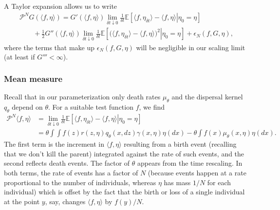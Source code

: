 \documentclass[12pt]{article}
\newcommand{\IE}{\mathbb E}
\newcommand{\Pgen}{\mathcal{P}}    %
\numberwithin{equation}{section}
\begin{document}
A Taylor expansion allows us to write
\begin{multline}
	\label{generator prelimit}
    \Pgen^N
    G(\langle f,\eta \rangle)
    =
    G'(\langle f, \eta \rangle)
    \lim_{\delta t\downarrow 0} \frac{1}{\delta t}
    \IE\left[
        \left. \langle f, \eta_{\delta t} \rangle
        -
        \langle f, \eta \rangle
        \right| \eta_0=\eta
    \right]
    \\
    \qquad {}
    + \frac{1}{2}
        G''(\langle f,\eta\rangle)
    \lim_{\delta t\downarrow 0}\frac{1}{\delta t}
    \IE\left[
        \left.\big(\langle f,\eta_{\delta t}\rangle
        -
        \langle f, \eta\rangle\big)^2 \right|\eta_0=\eta
    \right]
    +
    \epsilon_N(f, G, \eta),
\end{multline}
where the terms that make up 
$\epsilon_N(f, G, \eta)$
will be negligible in our scaling limit (at least if $G'''<\infty$). 

\subsubsection*{Mean measure}

Recall that in our parameterization only death rates $\mu_\theta$
and the dispersal kernel $q_\theta$ depend on $\theta$.
For a suitable test function $f$, we find
\begin{equation} \label{mean measure}
    \begin{split}
    \Pgen^N \langle f, \eta \rangle
    &=
    \lim_{\delta t\downarrow 0} \frac{1}{\delta t}
    \IE\left[ \left.
        \langle f, \eta_{\delta t} \rangle
        -
        \langle f, \eta\rangle
        \right| \eta_0 = \eta
    \right]
    \\
    &=
    \theta \int
        \int f(z) r(z,\eta) q_\theta(x,dz)
    \gamma(x, \eta) \eta(dx)
    -
    \theta \int f(x)\mu_\theta(x, \eta)
    \eta(dx).
    \end{split}
\end{equation}
The first term is the increment in $\langle f,\eta\rangle$
resulting from a birth event (recalling that
we don't kill the parent) integrated against the rate of such events,
and the second reflects death events.
The factor of $\theta$ appears from the time rescaling.
In both terms,
the rate of events has a factor of $N$ (because events happen at a rate 
proportional to the number of individuals,
whereas $\eta$ has mass $1/N$ for each individual)
which is offset by the fact that  
the birth or loss of a single 
individual at the point $y$, say, changes $\langle f,\eta\rangle$
by $f(y)/N$.
\end{document}

